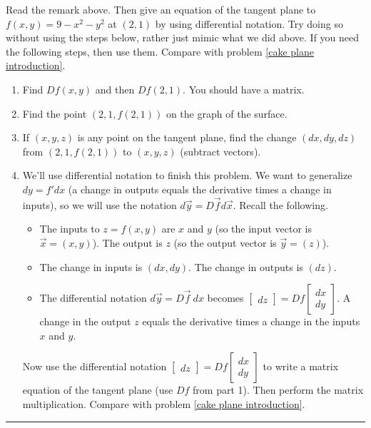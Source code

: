 \begin{problem}
Read the remark above. Then give an equation of the tangent plane to $f(x,y)=9-x^2-y^2$ at $(2,1)$ by using differential notation. Try doing so without using the steps below, rather just mimic what we did above. If you need the following steps, then use them. Compare with problem \ref{cake plane introduction}.
\begin{enumerate}
 \item Find $Df(x,y)$ and then $Df(2,1)$. You should have a matrix.
 \item Find the point $(2,1,f(2,1))$ on the graph of the surface.
 \item If $(x,y,z)$ is any point on the tangent plane, find the change $(dx,dy,dz)$ from $(2,1, f(2,1))$ to $(x,y,z)$ (subtract vectors).
 \item We'll use differential notation to finish this problem. We want to generalize $dy=f'dx$ (a change in outputs equals the derivative times a change in inputs), so we will use the notation $d\vec y = D\vec fd\vec x$. Recall the following. 
\begin{itemize} 
\item  The inputs to $z=f(x,y)$ are $x$ and $y$ (so the input vector is $\vec x=(x,y)$).  The output is $z$ (so the output vector is $\vec y= (z)$). 
\item The change in inputs is $(dx,dy)$.  The change in outputs is $(dz)$. 
\item The differential notation $d\vec y=D\vec f\ dx$ becomes $\begin{bmatrix}dz\end{bmatrix}=Df\begin{bmatrix}dx \\ dy\end{bmatrix}$. A change in the output $z$ equals the derivative times a change in the inputs $x$ and $y$.
\end{itemize}
Now use the differential notation $\begin{bmatrix}dz\end{bmatrix}=Df\begin{bmatrix}dx \\ dy\end{bmatrix}$ to write a matrix equation of the tangent plane (use $Df$ from part 1). Then perform the matrix multiplication. Compare with problem \ref{cake plane introduction}.
\end{enumerate}
\hrule\end{problem}

